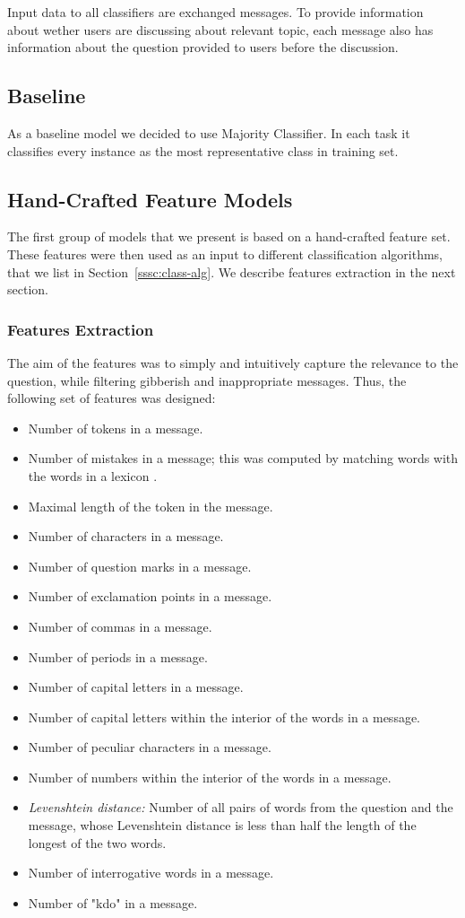 \documentclass[11pt,a4paper]{article}
\begin{document}
Input data to all classifiers are exchanged messages. To provide information about wether users are discussing about relevant topic, each message also has information about the question provided to users before the discussion.

\subsection{Baseline}
As a baseline model we decided to use Majority Classifier. In each task it classifies every instance as the most representative class in training set.

\subsection{Hand-Crafted Feature Models}
The first group of models that we present is based on a hand-crafted feature set. These features were then used as an input to different classification algorithms, that we list in Section~\ref{sssc:class-alg}. We describe features extraction in the next section.

\subsubsection{Features Extraction}
The aim of the features was to simply and intuitively capture the relevance to the question, while filtering gibberish and inappropriate messages. Thus, the following set of features was designed:

\begin{itemize}
     \item Number of tokens in a message.
     \item Number of mistakes in a message; this was computed by matching words with the words in a lexicon \cite{11356/1230}.
     \item Maximal length of the token in the message.
     \item Number of characters in a message.
     \item Number of question marks in a message.
     \item Number of exclamation points in a message.
     \item Number of commas in a message.
     \item Number of periods in a message.
     \item Number of capital letters in a message.
     \item Number of capital letters within the interior of the words  in a message.
     \item Number of peculiar characters in a message.
     \item Number of numbers within the interior of the words in a message.
     \item \textit{Levenshtein distance:} Number of all pairs of words from the question and the message, whose Levenshtein distance is less than half the length of the longest of the two words.
     \item Number of interrogative words in a message.
     \item Number of "kdo" in a message.
\end{itemize}
\end{document}
